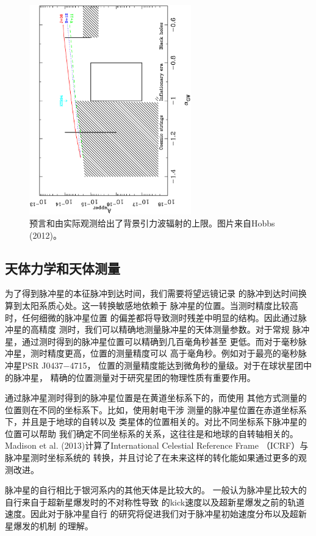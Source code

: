 \begin{figure}
\centering
\includegraphics[width=7cm,angle=-90,trim=1cm 1cm 0cm 1cm]{limit.ps}
\caption{预言和由实际观测给出了背景引力波辐射的上限。图片来自Hobbs (2012)\supercite{hobbs12b}。}
\label{limit}
\end{figure}

\subsection{天体力学和天体测量}

为了得到脉冲星的本征脉冲到达时间，我们需要将望远镜记录
的脉冲到达时间换算到太阳系质心处。这一转换敏感地依赖于
脉冲星的位置。当测时精度比较高时，任何细微的脉冲星位置
的偏差都将导致测时残差中明显的结构。因此通过脉冲星的高精度
测时，我们可以精确地测量脉冲星的天体测量参数。对于常规
脉冲星，通过测时得到的脉冲星位置可以精确到几百毫角秒甚至
更低。而对于毫秒脉冲星，测时精度更高，位置的测量精度可以
高于毫角秒。例如对于最亮的毫秒脉冲星PSR J0437$-$4715，
位置的测量精度能达到微角秒的量级。对于在球状星团中的脉冲星，
精确的位置测量对于研究星团的物理性质有重要作用。

通过脉冲星测时得到的脉冲星位置是在黄道坐标系下的，而使用
其他方式测量的位置则在不同的坐标系下。比如，使用射电干涉
测量的脉冲星位置在赤道坐标系下，并且是于地球的自转以及
类星体的位置相关的。对比不同坐标系下脉冲星的位置可以帮助
我们确定不同坐标系的关系，这往往是和地球的自转轴相关的。
Madison et al. (2013)\supercite{Madison13}计算了International 
Celestial Reference Frame （ICRF）与脉冲星测时坐标系统的
转换，并且讨论了在未来这样的转化能如果通过更多的观测改进。

脉冲星的自行相比于银河系内的其他天体是比较大的\supercite{hobbs}。
一般认为脉冲星比较大的自行来自于超新星爆发时的不对称性导致
的kick速度以及超新星爆发之前的轨道速度。因此对于脉冲星自行
的研究将促进我们对于脉冲星初始速度分布以及超新星爆发的机制
的理解。

